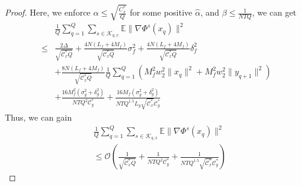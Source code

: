 \documentclass[lettersize,journal]{IEEEtran}
\begin{document}
\begin{proof}
Here, we enforce $\alpha\leq \sqrt{\frac{C_x^*}{Q}}$ for some positive $\hat{\alpha}$, and $\beta \leq \frac{1}{NTQ}$, we can get
\begin{align*}
     &\frac{1}{Q}\sum_{q=1}^Q\sum_{s\in \mathcal{K}_{q,x}}\mathbb{E}\|\nabla \Phi^s(x_{q})\|^2\\\leq& \frac{2\Delta}{\sqrt{\mathcal{C}_x^*Q}}+\frac{4N(L_f+4M_f)}{\sqrt{\mathcal{C}_x^*Q}}\sigma_f^2+\frac{4N(L_f+4M_f)}{\sqrt{\mathcal{C}_x^*Q}}\delta^2_f\\&+\frac{8N(L_f+4M_f)}{\sqrt{\mathcal{C}_x^*Q}}\frac{1}{Q}\sum_{q=1}^Q(M_f^2 w_2^2\|x_q\|^2+M_f^2 w_2^2 \|y_{q+1}\|^2)\\
     &+\frac{16M_f^2(\sigma_{g}^2+\delta_{g}^2)}{NTQ^2\mathcal{C}^{*}_{y}}+\frac{16M_f(\sigma_{g}^2+\delta_{g}^2)}{NTQ^{1.5}L_y\sqrt{\mathcal{C}_x^*}\mathcal{C}^{*}_{y}}
\end{align*}
Thus, we can gain 
\begin{align*}
    &\frac{1}{Q}\sum_{q=1}^Q\sum_{s\in \mathcal{K}_{q,x}}\mathbb{E}\|\nabla \Phi^s(x_{q})\|^2\\&\leq \mathcal{O}(\frac{1}{\sqrt{\mathcal{C}_x^*Q}}+\frac{1}{NTQ^2\mathcal{C}^{*}_{y}}+\frac{1}{NTQ^{1.5}\sqrt{\mathcal{C}_x^*}\mathcal{C}^{*}_{y}})
\end{align*}
\end{proof}
\end{document}
